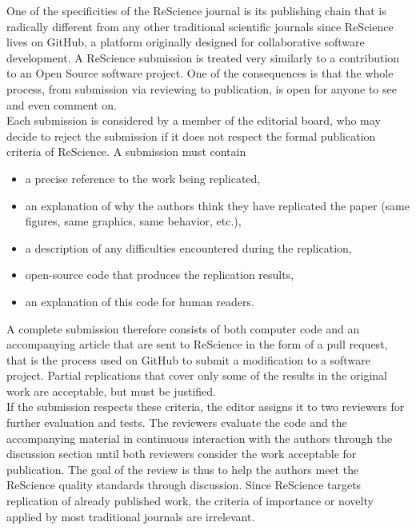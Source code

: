 \documentclass[a4paper,10pt, twocolumn]{article}
\begin{document}
One of the specificities of the ReScience journal is its publishing
chain that is radically different from any other traditional
scientific journals since ReScience lives on GitHub, a platform
originally designed for collaborative software development. A
ReScience submission is treated very similarly to a contribution to an
Open Source software project. One of the consequences is that the
whole process, from submission via reviewing
to publication, is open for anyone to see and even comment on.\\

Each submission is considered by a member of the editorial board, who
may decide to reject the submission if it does not respect the formal
publication criteria of ReScience. A submission must contain
\begin{itemize}
\item a precise reference to the work being replicated,
\item an explanation of why the authors think they have replicated the paper
      (same figures, same graphics, same behavior, etc.),
\item a description of any difficulties encountered during the
      replication,
\item open-source code that produces the replication results,
\item an explanation of this code for human readers.
\end{itemize}
A complete submission therefore consists of both computer code and an
accompanying article that are sent to ReScience in the form of a pull
request, that is the process used on GitHub to submit a modification
to a software project.
%
Partial replications that cover only some of the results in the
original work are acceptable, but must be justified.\\

If the submission respects these criteria, the editor assigns it to
two reviewers for further evaluation and tests. The reviewers evaluate
the code and the accompanying material in continuous interaction with
the authors through the discussion section until both reviewers
consider the work acceptable for publication. The goal of the review
is thus to help the authors meet the ReScience quality standards
through discussion. Since ReScience targets replication of already
published work, the criteria of importance or novelty applied by most
traditional journals are irrelevant.
\end{document}
